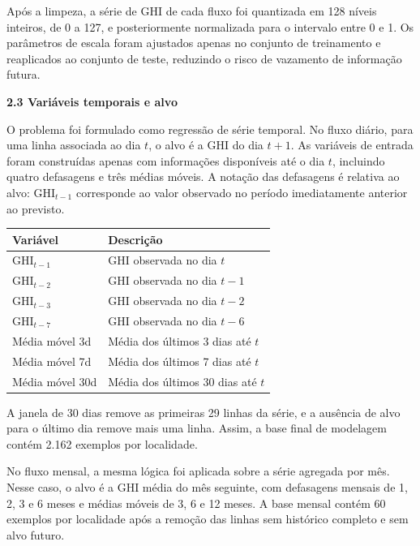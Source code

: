 \documentclass[12pt,a4paper]{article}
\begin{document}
Após a limpeza, a série de GHI de cada fluxo foi quantizada em 128 níveis inteiros, de 0 a 127, e posteriormente normalizada para o intervalo entre 0 e 1. Os parâmetros de escala foram ajustados apenas no conjunto de treinamento e reaplicados ao conjunto de teste, reduzindo o risco de vazamento de informação futura.

\vspace{12pt}

\noindent\textbf{2.3 Variáveis temporais e alvo}

O problema foi formulado como regressão de série temporal. No fluxo diário, para uma linha associada ao dia $t$, o alvo é a GHI do dia $t+1$. As variáveis de entrada foram construídas apenas com informações disponíveis até o dia $t$, incluindo quatro defasagens e três médias móveis. A notação das defasagens é relativa ao alvo: GHI$_{t-1}$ corresponde ao valor observado no período imediatamente anterior ao previsto.

\vspace{6pt}

\begin{center}
\begin{tabular}{ll}
\toprule
\textbf{Variável} & \textbf{Descrição} \\
\midrule
GHI$_{t-1}$ & GHI observada no dia $t$ \\
GHI$_{t-2}$ & GHI observada no dia $t-1$ \\
GHI$_{t-3}$ & GHI observada no dia $t-2$ \\
GHI$_{t-7}$ & GHI observada no dia $t-6$ \\
Média móvel 3d & Média dos últimos 3 dias até $t$ \\
Média móvel 7d & Média dos últimos 7 dias até $t$ \\
Média móvel 30d & Média dos últimos 30 dias até $t$ \\
\bottomrule
\end{tabular}
\end{center}

\vspace{6pt}

A janela de 30 dias remove as primeiras 29 linhas da série, e a ausência de alvo para o último dia remove mais uma linha. Assim, a base final de modelagem contém 2.162 exemplos por localidade.

No fluxo mensal, a mesma lógica foi aplicada sobre a série agregada por mês. Nesse caso, o alvo é a GHI média do mês seguinte, com defasagens mensais de 1, 2, 3 e 6 meses e médias móveis de 3, 6 e 12 meses. A base mensal contém 60 exemplos por localidade após a remoção das linhas sem histórico completo e sem alvo futuro.
\end{document}
